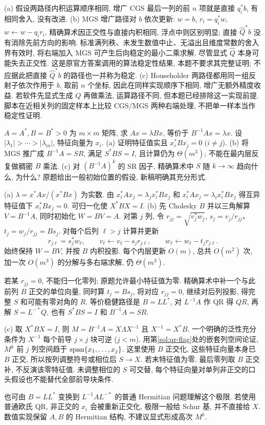 \begin{solution}
(a) 假设两路径内积运算顺序相同, 增广 CGS 最后一列的前 $n$ 项就是直接 $q_i^*b$, 有相同舍入, 没有改进.
(b) MGS 增广路径对 $b$ 依次更新: $w=b$, $r_i=q_i^*w$, $w\leftarrow w-q_ir_i$. 精确算术因正交性与直接内积相同, 浮点中则区别明显; 直接 $\widehat Q^*b$ 没有消除先前方向的影响. 标准满列秩、未发生数值中止、无溢出且维度常数的舍入界有效时, 将右端加入 MGS 可产生后向稳定的最小二乘求解, 尽管显式 $\widehat Q$ 本身可能失去正交性. 这是原官方答案调用的算法稳定性结果, 本题不要求其完整证明; 不应据此把直接 $\widehat Q^*b$ 的路径也一并称为稳定.
(c) Householder 两路径都用同一组反射子依次作用于 $b$, 取前 $n$ 个坐标, 因此在同样实现顺序下相同, 增广无额外精度收益. 若软件先显式生成 $Q$ 再做乘法, 运算路径不同, 但本题已经排除这一实现前提. 脚本在近相关列的固定样本上比较 CGS/MGS 两种右端处理, 不把单一样本当作稳定性证明.
\end{solution}
\begin{exercise}\label{e2015:q3}
$A=A^*,B=B^*>0$ 为 $m\times m$ 矩阵, 求 $Ax=\lambda Bx$, 等价于 $B^{-1}Ax=\lambda x$. 设 $|\lambda_1|>\cdots>|\lambda_m|$, 特征向量为 $x_i$.
(a) 证明特征值实且 $x_i^*Bx_j=0$ ($i\ne j$).
(b) 将 MGS 推广成 $B^{-1}A=SR$, 满足 $S^*BS=I$, 且计算仍为 $\Theta(m^3)$; 不能在最内层反复做稠密 $B$ 乘法.
(c) 对 $(B^{-1}A)^k$ 的 SR 因子, 精确算术中 $S$ 随 $k\to\infty$ 趋向什么, 为什么? 原题给出一般初始位置的假设, 新稿明确其充分形式.
\end{exercise}
\begin{solution}
(a) $\lambda=x^*Ax/(x^*Bx)$ 为实数. 由 $x_i^*Ax_j=\lambda_jx_i^*Bx_j$ 和 $x_i^*Ax_j=\lambda_i x_i^*Bx_j$ 得互异特征值下 $x_i^*Bx_j=0$. 可归一化使 $X^*BX=I$.
(b) 先 Cholesky $B$ 并以三角解算 $V=B^{-1}A$, 同时初始化 $W=BV=A$. 对第 $j$ 列, 令 $r_{jj}=\sqrt{v_j^*w_j}$, $s_j=v_j/r_{jj}$、$t_j=w_j/r_{jj}=Bs_j$. 对每个后列 $\ell>j$ 计算并更新
\[
 r_{j\ell}=s_j^*w_\ell,\qquad
 v_\ell\leftarrow v_\ell-s_jr_{j\ell},\qquad
 w_\ell\leftarrow w_\ell-t_jr_{j\ell}.
\]
始终保持 $W=BV$, 并按 $B$ 内积投影. 每个内层更新 $O(m)$, 总共 $O(m^2)$ 次, 加一次 $O(m^3)$ 的分解与多右端求解, 仍 $\Theta(m^3)$.

若某 $r_{jj}=0$, 不能归一化零列; 原题允许最小特征值为零. 精确算术中补一个与此前列 $B$ 正交的单位向量, 同时算 $t_j=Bs_j$, 将对应 $r_{jj}=0$, 继续对后列投影, 得完整 $S$ 和可能有零对角的 $R$. 等价稳健路径是 $B=LL^*$, 对 $L^{-1}A$ 作 QR 得 $QR$, 再解 $S=L^{-*}Q$, 也有 $S^*BS=I$ 和 $B^{-1}A=SR$.

(c) 取 $X^*BX=I$, 则 $M=B^{-1}A=X\Lambda X^{-1}$ 且 $X^{-1}=X^*B$. 一个明确的泛性充分条件为 $X^{-1}$ 每个前导 $j\times j$ 块可逆 ($j<m$). 用第\ref{sol:qr-flag}处的嵌套列空间论证, $M^k$ 前 $j$ 列空间趋于 $\operatorname{span}\{x_1,\ldots,x_j\}$. 这里使用 $B$ 正交化, 这些特征向量本身已 $B$ 正交, 所以按列调整符号或相位后 $S\to X$. 若末特征值为零, 最后零列取 $B$ 正交补, 不反演该零特征值. 未调整相位的 $S$ 可交替, 每个特征向量对单列非正交的口头假设也不能替代全部前导块条件.

也可由 $B=LL^*$ 变换到 $L^{-1}AL^{-*}$ 的普通 Hermitian 问题理解这个极限. 若使用普通欧氏 QR, 非正交的 $x_i$ 会被重新正交化, 极限一般给 Schur 基, 并不直接给 $X$. 数值实现保留 $A,B$ 的 Hermitian 结构, 不建议显式形成高次 $M^k$.
\end{solution}
